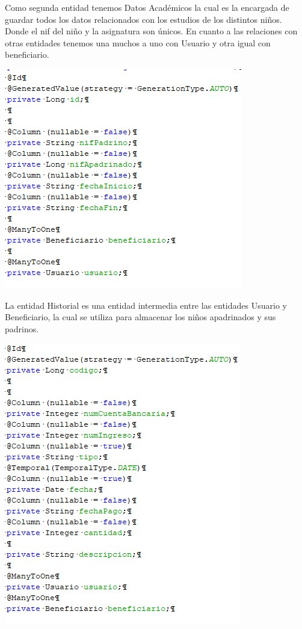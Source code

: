 \documentclass{article}
\begin{document}
Como segunda entidad tenemos Datos Académicos la cual es la encargada de guardar todos los datos relacionados con los estudios de los distintos niños.
Donde el nif del niño y la asignatura son únicos.
En cuanto a las relaciones con otras entidades tenemos una muchos a uno con Usuario y otra igual con beneficiario. 

\begin{center}
\includegraphics[scale=0.5]{images/historial.jpg}
\end{center}

La entidad Historial es una entidad intermedia entre las entidades Usuario y Beneficiario, la cual se utiliza para almacenar los niños apadrinados y sus padrinos.

\begin{center}
\includegraphics[scale=0.35]{images/ingresos.jpg}
\end{center}
\end{document}
